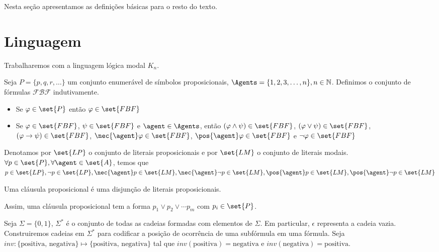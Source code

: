 
Nesta seção apresentamos as definições básicas para o resto do texto.

\section{Linguagem}
Trabalharemos com a linguagem lógica modal $K_n$.

\begin{definition}
	Seja $P = \{p, q, r, \dots\}$ um conjunto enumerável de símbolos proposicionais, $\Agents = \{1, 2, 3, \dots, n\}, n \in \mathbb{N}$. Definimos o conjunto de fórmulas $\mathcal{FBF}$ indutivamente.
	
	\begin{itemize}
		\item Se $\varphi \in \set{P}$ então $\varphi \in \set{FBF}$
		\item Se $\varphi \in \set{FBF}$, $\psi \in \set{FBF}$ e $\agent \in \Agents$, então $(\varphi \land \psi) \in \set{FBF}$, $(\varphi \lor \psi) \in \set{FBF}$, $(\varphi \rightarrow \psi) \in \set{FBF}$, $\nec{\agent} \varphi \in \set{FBF}$, $\pos{\agent} \varphi \in \set{FBF}$ e $\neg\varphi \in \set{FBF}$
	\end{itemize}
\end{definition}

\begin{definition}
	Denotamos por $\set{LP}$ o conjunto de literais proposicionais e por $\set{LM}$ o conjunto de literais modais.
	$\forall p \in \set{P}, \forall \agent \in \set{A}$, temos que $ p \in \set{LP}, \neg p \in \set{LP}, \nec{\agent} p \in \set{LM}, \nec{\agent} \neg p \in \set{LM}, \pos{\agent} p \in \set{LM}, \pos{\agent} \neg p \in \set{LM}$
\end{definition}

\begin{definition}
	Uma cláusula proposicional é uma disjunção de literais proposicionais.
\end{definition}

Assim, uma cláusula proposicional tem a forma $p_1 \lor p_2 \lor \cdots p_m$ com $p_i \in \set{P}$.

Seja $\Sigma = \{0, 1\}$, $\Sigma^*$ é o conjunto de todas as cadeias formadas com elementos de $\Sigma$. Em particular, $\epsilon$ representa a cadeia vazia. Construiremos cadeias em $\Sigma^*$ para codificar a posição de ocorrência de uma subfórmula em uma fórmula. Seja $inv \colon \{\text{positiva, negativa}\} \mapsto \{\text{positiva, negativa}\}$ tal que $inv(\text{positiva}) = \text{negativa}$ e $inv(\text{negativa}) = \text{positiva}$.

